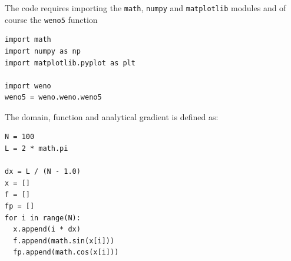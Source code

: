 \documentclass[11pt]{article}
\begin{document}
The code requires importing the \texttt{math}, \texttt{numpy} and \texttt{matplotlib} modules and of course the \texttt{weno5} function
\begin{lstlisting}
import math
import numpy as np
import matplotlib.pyplot as plt

import weno
weno5 = weno.weno.weno5
\end{lstlisting}

The domain, function and analytical gradient is defined as:
\begin{lstlisting}
N = 100
L = 2 * math.pi

dx = L / (N - 1.0)
x = []
f = []
fp = []
for i in range(N):
  x.append(i * dx)
  f.append(math.sin(x[i]))
  fp.append(math.cos(x[i]))
\end{lstlisting}
\end{document}
